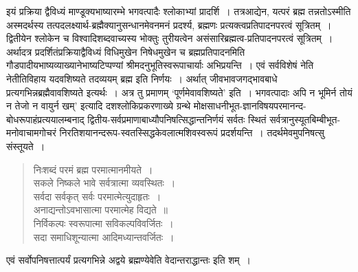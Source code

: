 {इयं प्रक्रिया द्वैविध्यं माण्डूक्यभाष्यारम्भे भगवत्पादैः श्लोकाभ्यां प्रादर्शि~। तत्र\break आद्येन, यत्परं ब्रह्म तन्नतोऽस्मीति अस्मदर्थस्य तत्पदलक्ष्यार्थ-ब्रह्मैक्यानुसन्धानमेव\break नमनं प्रदर्श्य, ब्रह्मणः प्रत्यक्त्वप्रतिपादनपरत्वं सूत्रितम्~। द्वितीयेन श्लोकेन च विश्वादिशब्द\-वाच्यस्य भोक्तुः तुरीयत्वेन असंसारिब्रह्मत्व-प्रतिपादनपरत्वं सूत्रितम्~। अर्थादत्र प्रदर्शितं\break प्रक्रियाद्वैविध्यं विधिमुखेन निषेधमुखेन च ब्रह्मप्रतिपादनमिति गौडपादीयभाष्यव्याख्याने\break भाष्यटिप्पण्यां श्रीमदनुभूतिस्वरूपाचार्याः अभिप्रयन्ति~। एवं सर्वविशेषं नेति नेतीति\break विहाय यदवशिष्यते तदव्ययम् ब्रह्म इति निर्णयः~। अर्थात् जीवभावजगद्भावबाधे प्रत्यगभिन्नब्रह्मैवावशिष्यते इत्यर्थः~। अत्र तु प्रमाणम् ‘पूर्णमेवावशिष्यते' इति~। भगवत्पादाः अपि न भूमिर्न तोयं न तेजो न वायुर्न खम्' इत्यादि दशश्लोकिप्रकरणाख्ये ग्रन्थे मोक्षसाधनीभूत-ज्ञानविषयपरमानन्द-बोधरूपाहंप्रत्ययालम्बनाद् द्वितीय-सर्वप्रमाणाबाध्यौपनिषत्सिद्धान्त\-\break निर्णयं सर्वतः स्थितं सर्वत्रानुस्यूतबिम्बीभूत-मनोवाचामगोचरं निरतिशयानन्दरूप-स्वतस्सिद्ध\break केवलात्मशिवस्वरूपं प्रदर्शयन्ति~। तदर्थमेवमुपनिषत्सु संस्तूयते~। 

\begin{verse}
निःशब्दं परमं ब्रह्म परमात्मानमीयते~। \\
सकले निष्कले भावे सर्वत्रात्मा व्यवस्थितः~। \\
सर्वदा सर्वकृत् सर्वः परमात्मेत्युदाहृतः~। \\
अनाद्यन्तोऽवभासात्मा परमात्मेह विद्यते~॥\\
निर्विकल्पः स्वरूपात्मा सविकल्पविवर्जितः~। \\
सदा समाधिशून्यात्मा आदिमध्यान्तवर्जितः~। 
\end{verse}

एवं सर्वोपनिषत्तात्पर्यं प्रत्यगभिन्ने अद्वये ब्रह्मण्येवेति वेदान्तराद्धान्तः  इति शम्~। 

\articleend
}

